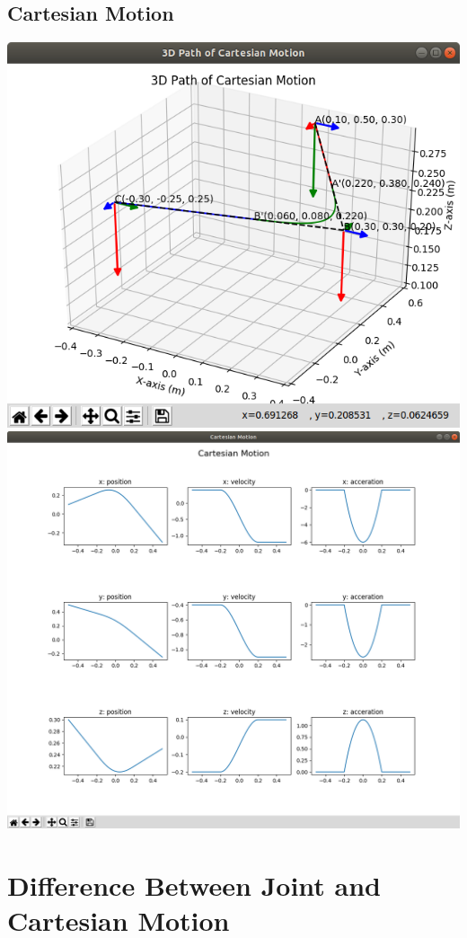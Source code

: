 \documentclass[12pt]{article}
\begin{document}
\subsection{Cartesian Motion}
\includegraphics[scale=0.5]{cartesian_path}\\
\includegraphics[scale=0.3]{cartesian_param}
\section{Difference Between Joint and Cartesian Motion}
\end{document}
